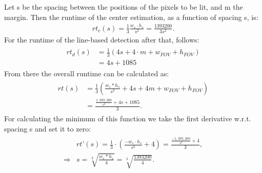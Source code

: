 \documentclass[journal,final,a4paper,twoside]{PS}
\begin{document}
Let s be the spacing between the positions of the pixels to be lit, and m the margin. Then the runtime of the center estimation, as a function of spacing s, is:
\begin{align}
rt_c (s) =\frac{1}{3} \frac{w_s\cdot h_s}{ s^2} =\frac{1393200}{3s^2} .
\end{align}
For the runtime of the line-based detection after that, follows:
\begin{align}\begin{split}
rt_d (s) &=\frac{1}{3}\left( 4s + 4\cdot m + w_{FOV} + h_{FOV}\right)\\& = 4s + 1085\end{split}
\end{align}
From there the overall runtime can be calculated as:
\begin{align}\begin{split}
rt(s) &=\frac{1}{3}\left(\frac{w_s*h_s}{s^2} + 4s + 4m + w_{FOV} + h_{FOV}\right)\\& = \frac{\frac{1,393,200}{s^2} + 4s +1085}{3}.\end{split}
\end{align}
For calculating the minimum of this function we take the first derivative w.r.t. spacing s and set it to zero:
\begin{align}\begin{split}
&rt’(s) = \frac{1}{3} \cdot \left( \frac{-w_s \cdot h_s}{s^3 }  + 4\right) = \frac{ \frac{-1,393,200}{s^3}+ 4}{3},\\
\Rightarrow &s = \sqrt[3]{\frac{w_s * h_s}{4}} = \sqrt[3]{\frac{1393200}{4}}. \end{split}
\end{align}
\end{document}
